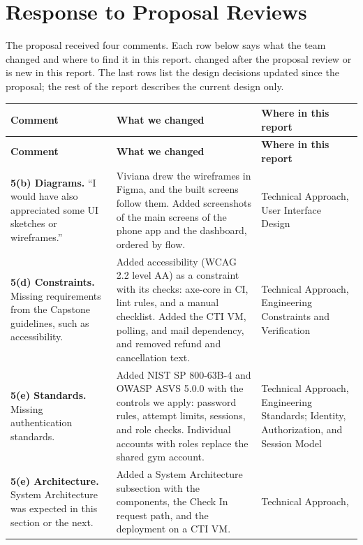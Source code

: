 \section*{Response to Proposal Reviews}

The proposal received four comments. Each row below says what the team changed and where to find it in this report. \ifshowchanges{} changed after the proposal review or is new in this report. \fi{}The last rows list the design decisions updated since the proposal; the rest of the report describes the current design only.

\begin{center}
\small
\begin{longtable}{L{3.3cm} L{6.4cm} L{3.7cm}}
\toprule
\textbf{Comment} & \textbf{What we changed} & \textbf{Where in this report} \\
\midrule
\endfirsthead
\toprule
\textbf{Comment} & \textbf{What we changed} & \textbf{Where in this report} \\
\midrule
\endhead
\bottomrule
\endlastfoot
\textbf{5(b) Diagrams.} ``I would have also appreciated some UI sketches or wireframes.'' & Viviana drew the wireframes in Figma, and the built screens follow them. Added screenshots of the main screens of the phone app and the dashboard, ordered by flow. & Technical Approach, User Interface Design \\
\addlinespace
\textbf{5(d) Constraints.} Missing requirements from the Capstone guidelines, such as accessibility. & Added accessibility (WCAG 2.2 level AA) as a constraint with its checks: axe-core in CI, lint rules, and a manual checklist. Added the CTI VM, polling, and mail dependency, and removed refund and cancellation text. & Technical Approach, Engineering Constraints and Verification \\
\addlinespace
\textbf{5(e) Standards.} Missing authentication standards. & Added NIST SP 800-63B-4 and OWASP ASVS 5.0.0 with the controls we apply: password rules, attempt limits, sessions, and role checks. Individual accounts with roles replace the shared gym account. & Technical Approach, Engineering Standards; Identity, Authorization, and Session Model \\
\addlinespace
\textbf{5(e) Architecture.} System Architecture was expected in this section or the next. & Added a System Architecture subsection with the components, the Check In request path, and the deployment on a CTI VM. & Technical Approach,  \\

\end{longtable}
\end{center}
